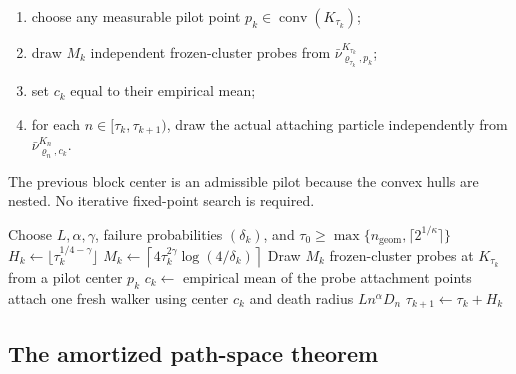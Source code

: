 \documentclass[11pt]{article}
\theoremstyle{mainthm}
\theoremstyle{definition}
\theoremstyle{remark}
\newcommand{\conv}{\operatorname{conv}}
\begin{document}
\begin{enumerate}
  \item choose any measurable pilot point $p_k\in\conv(K_{\tau_k})$;
  \item draw $M_k$ independent frozen-cluster probes from
  $\bar\nu_{\varrho_{\tau_k},p_k}^{K_{\tau_k}}$;
  \item set $c_k$ equal to their empirical mean;
  \item for each $n\in[\tau_k,\tau_{k+1})$, draw the actual attaching particle independently from
  $\bar\nu_{\varrho_n,c_k}^{K_n}$.
\end{enumerate}

The previous block center is an admissible pilot because the convex hulls are nested. No iterative fixed-point search is required.

\begin{algorithm}[H]
\caption{Amortized center tracking}
\label{alg:amortized}
\begin{algorithmic}[1]
\State Choose $L,\alpha,\gamma$, failure probabilities $(\delta_k)$, and $\tau_0\ge\max\{n_{\mathrm{geom}},\lceil2^{1/\kappa}\rceil\}$
  \State $H_k\gets\lfloor\tau_k^{1/4-\gamma}\rfloor$
  \State $M_k\gets\left\lceil4\tau_k^{2\gamma}\log(4/\delta_k)\right\rceil$
  \State Draw $M_k$ frozen-cluster probes at $K_{\tau_k}$ from a pilot center $p_k$
  \State $c_k\gets$ empirical mean of the probe attachment points
    \State attach one fresh walker using center $c_k$ and death radius $Ln^\alpha D_n$
  \EndFor
  \State $\tau_{k+1}\gets\tau_k+H_k$
\EndFor
\end{algorithmic}
\end{algorithm}

\subsection{The amortized path-space theorem}
\end{document}
